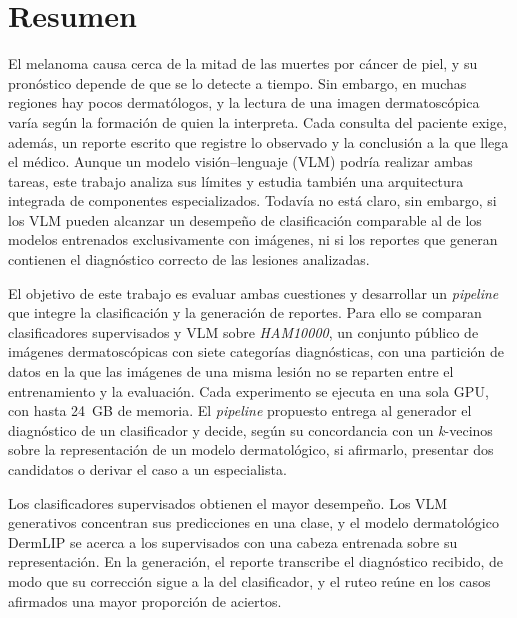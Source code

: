 \thispagestyle{plain}
\chapter*{Resumen}

El melanoma causa cerca de la mitad de las muertes por cáncer de piel, y su pronóstico depende de que se lo detecte a
tiempo. Sin embargo, en muchas regiones hay pocos dermatólogos, y la lectura de una imagen dermatoscópica varía según
la formación de quien la interpreta. Cada consulta del paciente exige, además, un reporte escrito que registre lo
observado y la conclusión a la que llega el médico. Aunque un modelo visión--lenguaje (VLM) podría realizar ambas tareas, este trabajo analiza sus límites y estudia también una arquitectura integrada de componentes especializados. Todavía no está claro, sin embargo, si los VLM pueden alcanzar un desempeño de
clasificación comparable al de los modelos entrenados exclusivamente con imágenes, ni si los reportes que generan
contienen el diagnóstico correcto de las lesiones analizadas.

El objetivo de este trabajo es evaluar ambas cuestiones y desarrollar un \emph{pipeline} que integre la clasificación
y la generación de reportes. Para ello se comparan clasificadores supervisados y VLM sobre \emph{HAM10000}, un conjunto
público de imágenes dermatoscópicas con siete categorías diagnósticas, con una partición de datos en la que las
imágenes de una misma lesión no se reparten entre el entrenamiento y la evaluación. Cada experimento se ejecuta en una
sola GPU, con hasta 24~GB de memoria. El \emph{pipeline} propuesto entrega al generador el diagnóstico de un
clasificador y decide, según su concordancia con un \emph{k}-vecinos sobre la representación de un modelo dermatológico,
si afirmarlo, presentar dos candidatos o derivar el caso a un especialista.

Los clasificadores supervisados obtienen el mayor desempeño. Los VLM generativos concentran sus predicciones en una
clase, y el modelo dermatológico DermLIP se acerca a los supervisados con una cabeza entrenada sobre su representación.
En la generación, el reporte transcribe el diagnóstico recibido, de modo que su corrección sigue a la del clasificador,
y el ruteo reúne en los casos afirmados una mayor proporción de aciertos.

